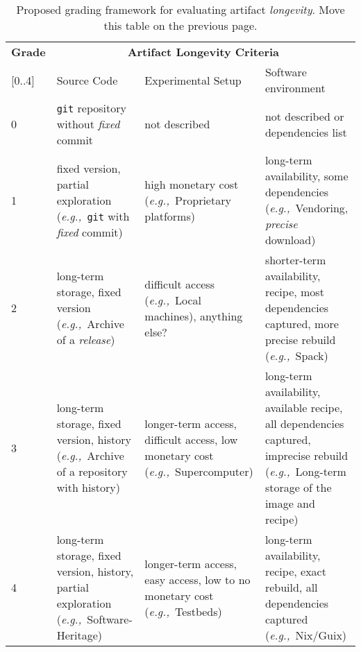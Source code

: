 \documentclass[sigconf,natbib=false]{acmart}
\newcommand{\eg}{\emph{e.g.,}}
\newcommand{\fmc}[1]{{\color{magenta} #1}} %
\begin{document}
\begin{table*}
  \caption{\label{tab:longevity}Proposed grading framework for evaluating artifact \emph{longevity}. \fmc{Move this table on the previous page.}}
  \centering
    \begin{tabularx}{\textwidth}{l X X X}
  \toprule
    
      \textbf{Grade} & \multicolumn{3}{c}{\textbf{Artifact Longevity Criteria}} \\
      \cmidrule(lr){2-4}
      [0..4] & Source Code & Experimental Setup & Software environment \\
      
  \midrule
      0 & \texttt{git} repository without \emph{fixed} commit  &  not described & not described or dependencies list \\
       \midrule
      1 & fixed version, partial exploration (\eg\ \texttt{git} with \emph{fixed} commit) &  high monetary cost (\eg\ Proprietary platforms) & long-term availability, some dependencies (\eg\ Vendoring, \emph{precise} download) \\
       \midrule
      2 & long-term storage, fixed version (\eg\ Archive of a \emph{release}) & difficult access (\eg\ Local machines), \fmc{anything else?} & shorter-term availability, recipe, most dependencies captured, more precise rebuild (\eg\ Spack) \\
       \midrule
      3 & long-term storage, fixed version, history (\eg\ Archive of a repository with history) & longer-term access, difficult access, low monetary cost (\eg\ Supercomputer) & long-term availability, available recipe, all dependencies captured, imprecise rebuild (\eg\ Long-term storage of the image and recipe) \\
       \midrule
      4 & long-term storage, fixed version, history, partial exploration (\eg\ Software-Heritage) & longer-term access, easy access, low to no monetary cost (\eg\ Testbeds) & long-term availability, recipe, exact rebuild, all dependencies captured (\eg\ Nix/Guix) \\
  \bottomrule
  \end{tabularx}
\end{table*}
\end{document}
